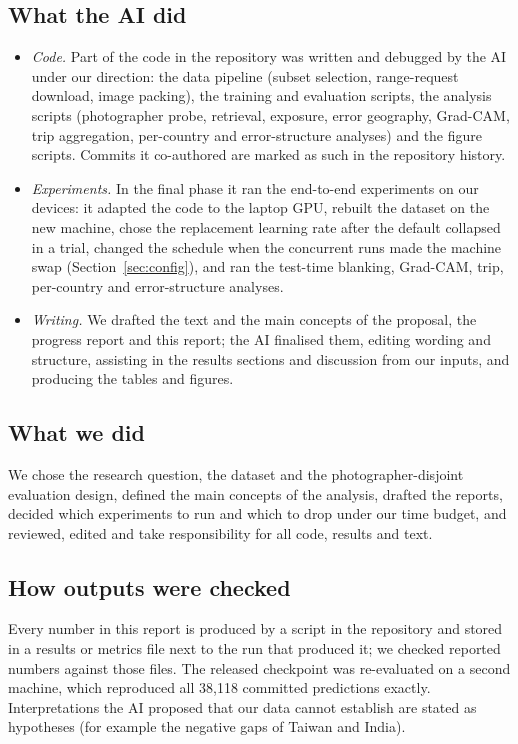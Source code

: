 \documentclass[11pt]{article}
\begin{document}
\subsection*{What the AI did}
\begin{itemize}[leftmargin=*]
\item \emph{Code.} Part of the code in the repository was written and debugged by the AI under our direction: the data
pipeline (subset selection, range-request download, image packing), the training and evaluation scripts,
the analysis scripts (photographer probe, retrieval, exposure, error geography, Grad-CAM, trip aggregation,
per-country and error-structure analyses) and the figure scripts. Commits it co-authored are marked as such
in the repository history.
\item \emph{Experiments.} In the final phase it ran the end-to-end experiments on our devices: it adapted the
code to the laptop GPU, rebuilt the dataset on the new machine, chose the replacement learning rate after
the default collapsed in a trial, changed the schedule when the concurrent runs made the machine swap
(Section~\ref{sec:config}), and ran the test-time blanking, Grad-CAM, trip, per-country and error-structure
analyses.
\item \emph{Writing.} We drafted the text and the main concepts of the proposal, the progress report and this
report; the AI finalised them, editing wording and structure, assisting in the results sections and
discussion from our inputs, and producing the tables and figures.
\end{itemize}

\subsection*{What we did}
We chose the research question, the dataset and the photographer-disjoint
evaluation design, defined the main concepts of the analysis, drafted the reports, decided which
experiments to run and which to drop under our time budget, and reviewed, edited and take responsibility
for all code, results and text.

\subsection*{How outputs were checked}
Every number in this report is produced by a script in the
repository and stored in a results or metrics file next to the run that produced it; we checked reported
numbers against those files. The released checkpoint was re-evaluated on a second machine, which
reproduced all 38{,}118 committed predictions exactly. Interpretations the AI proposed that our data cannot
establish are stated as hypotheses (for example the negative gaps of Taiwan and India).
\end{document}
